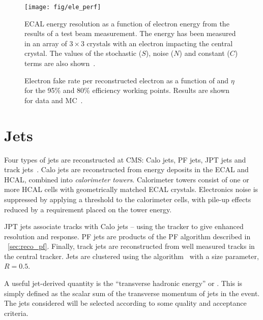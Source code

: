 \begin{figure}
  \centering
  \texttt{[image: fig/ele\_perf]}
  \caption[\ac{ECAL} energy resolution]{\ac{ECAL} energy
    resolution as a function of electron energy from the results of a
    test beam measurement. The energy has been measured in an array of
    $3\times 3$ crystals with an electron impacting the central
    crystal. The values of the stochastic ($S$), noise ($N$) and
    constant ($C$) terms are also shown~\cite{cms_jinst}.}
  \label{fig:reco_ele_perf}
\end{figure}

\begin{figure}
\centering
{}\quad
{}
\caption[Electron fake rate for 95\% and 80\% efficiency working points]{Electron fake rate per reconstructed electron as a function
  of  \Et and
   $\eta$ for the 95\% and 80\%
  efficiency working points. Results are shown for data and
  \ac{MC}~\cite{cms_ele_reco_pas}.}
\label{fig:reco_ele_fake_rate}
\end{figure}

\section{Jets}
\label{sec:reco_jets}
Four types of jets are reconstructed at \ac{CMS}: \acf{Calo} jets, \ac{PF} jets,
\ac{JPT} jets and track jets~\cite{jet_perf_pas}. \ac{Calo} jets are
reconstructed from energy deposits in the \ac{ECAL} and \ac{HCAL}, combined into
\emph{calorimeter towers}. Calorimeter towers consist of one or more \ac{HCAL} cells
with geometrically matched \ac{ECAL} crystals. Electronics noise is suppressed
by applying a threshold to the calorimeter cells, with pile-up effects reduced
by a requirement placed on the tower energy.

\ac{JPT} jets associate tracks with \ac{Calo} jets -- using the tracker to give
enhanced \Pt resolution and response. \ac{PF} jets are products of the \acl{PF}
algorithm described in \sec~\ref{sec:reco_pf}. Finally, track jets are
reconstructed from well measured tracks in the central tracker. Jets are
clustered using the \antiKT algorithm~\cite{antiKT} with a size parameter,
$R=0.5$.

A useful jet-derived quantity is the ``transverse hadronic energy'' or \HT. This
is simply defined as the scalar sum of the transverse momentum of jets in the
event. The jets considered will be selected according to some quality and
acceptance criteria.

